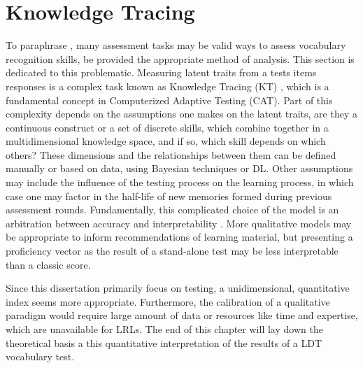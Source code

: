\section{Knowledge Tracing}
To paraphrase \textcite{meara_complexities_1994}, many assessment tasks may be valid ways to assess vocabulary recognition skills, be provided the appropriate method of analysis. This section is dedicated to this problematic. Measuring latent traits from a tests items responses is a complex task known as Knowledge Tracing (KT) \parencite{shen_survey_2024}, which is a fundamental concept in Computerized Adaptive Testing (CAT). Part of this complexity depends on the assumptions one makes on the latent traits, are they a continuous construct or a set of discrete skills, which combine together in a multidimensional knowledge space, and if so, which skill depends on which others? These dimensions and the relationships between them can be defined manually or based on data, using Bayesian techniques or DL\@. Other assumptions may include the influence of the testing process on the learning process, in which case one may factor in the half-life of new memories formed during previous assessment rounds. Fundamentally, this complicated choice of the model is an arbitration between accuracy and interpretability \parencite{pelanek_adaptive_2025}. More qualitative models may be appropriate to inform recommendations of learning material, but presenting a proficiency vector as the result of a stand-alone test may be less interpretable than a classic score.

Since this dissertation primarily focus on testing, a unidimensional, quantitative index seems more appropriate.  Furthermore, the calibration of a qualitative paradigm would require large amount of data or resources like time and expertise, which are unavailable for LRLs. The end of this chapter will lay down the theoretical basis a this quantitative interpretation of the results of a LDT vocabulary test.

